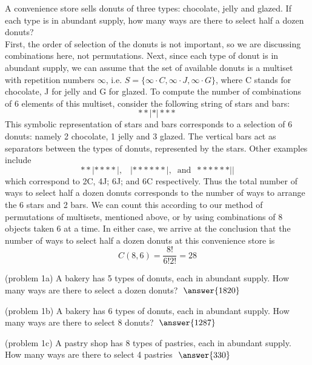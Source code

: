 \documentclass[handout]{ximera}
\begin{document}
\begin{example}[example 1]
A convenience store sells donuts of three types: chocolate, jelly and glazed.  If each type is in abundant supply,
how many ways are there to select half a dozen donuts?\\
First, the order of selection of the donuts is not important, so we are discussing combinations here, not permutations.
Next, since each type of donut is in abundant supply, we can assume that the set of available donuts is a multiset with repetition numbers $\infty$,
i.e. $S = \{\infty \cdot C, \infty \cdot J, \infty \cdot G\}$, where C stands for chocolate, J for jelly and G for glazed.
To compute the number of combinations of 6 elements of this multiset, consider the following string of stars and bars:
\[
**|*|***
\]
This symbolic representation of stars and bars corresponds to a selection of 6 donuts: namely 2 chocolate, 1 jelly and 3 glazed. The vertical bars act as separators between the types of donuts, represented by the stars. Other examples include
\[
**|****|, \;\;\; |******|, \;\; \mbox{and} \;\; ******||
\]
which correspond to 2C, 4J; 6J; and 6C respectively. Thus the total number of ways to select half a dozen donuts 
corresponds to the number of ways to arrange the 6 stars and 2 bars. We can count this according to our method of permutations of multisets, mentioned above, or by using combinations of 8 objects taken 6 at a time. In either case, we 
arrive at the conclusion that the number of ways to select half a dozen donuts at this convenience store is
\[
C(8,6) = \frac{8!}{6! 2!} = 28
\]
 
\end{example}


\begin{problem}(problem 1a)
A bakery has 5 types of donuts, each in abundant supply. How many ways are there to select a dozen donuts?
$\; \answer{1820}$
\end{problem}

\begin{problem}(problem 1b)
A bakery has 6 types of donuts, each in abundant supply. How many ways are there to select 8 donuts?
$\; \answer{1287}$
\end{problem}

\begin{problem}(problem 1c)
A pastry shop has 8 types of pastries, each in abundant supply. 
How many ways are there to select 4 pastries $\; \answer{330}$
\end{problem}
\end{document}
